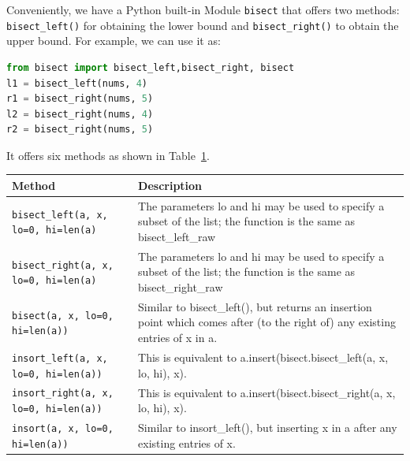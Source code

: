 \documentclass[main.tex]{subfiles}
\begin{document}
Conveniently, we have a Python built-in Module \texttt{bisect} that offers two methods: \texttt{bisect\_left()} for obtaining the lower bound and \texttt{bisect\_right()} to obtain the upper bound. For example, we can use it as:
\begin{lstlisting}[language=Python]
from bisect import bisect_left,bisect_right, bisect
l1 = bisect_left(nums, 4)
r1 = bisect_right(nums, 5)
l2 = bisect_right(nums, 4)
r2 = bisect_right(nums, 5)
\end{lstlisting}
It offers six methods as shown in Table~\ref{tab:method_bisect}. 
\begin{table}[h]
\begin{small}
\centering
\noindent{}
 \noindent \begin{tabular}{|p{}|p{}| }
  \hline
Method & Description   \\ \hline
\texttt{bisect\_left(a, x, lo=0, hi=len(a)}  &  The parameters lo and hi may be used to specify a subset of the list; the function is the same as bisect\_left\_raw  \\\hline
\texttt{bisect\_right(a, x, lo=0, hi=len(a)}  &  The parameters lo and hi may be used to specify a subset of the list; the function is the same as bisect\_right\_raw  \\\hline
\texttt{bisect(a, x, lo=0, hi=len(a))}  &Similar to bisect\_left(), but returns an insertion point which comes after (to the right of) any existing entries of x in a.\\ \hline
\texttt{insort\_left(a, x, lo=0, hi=len(a))}  &This is equivalent to a.insert(bisect.bisect\_left(a, x, lo, hi), x).\\ \hline
\texttt{insort\_right(a, x, lo=0, hi=len(a))} & This is equivalent to a.insert(bisect.bisect\_right(a, x, lo, hi), x).\\ \hline
\texttt{insort(a, x, lo=0, hi=len(a))} & Similar to insort\_left(), but inserting x in a after any existing entries of x.\\ \hline
\end{tabular}
  \label{tab:method_bisect}
  \end{small}
\end{table} 
\end{document}
